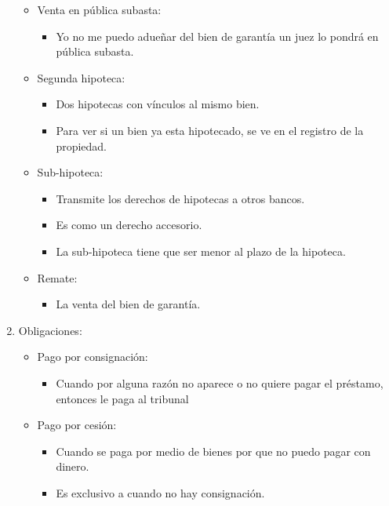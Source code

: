 \begin{enumerate}
\begin{itemize}
            \item Venta en pública subasta: 
                \begin{itemize}
                    \item Yo no me puedo adueñar del bien de garantía un juez lo pondrá en pública subasta.
                \end{itemize}
            
            \item Segunda hipoteca: 
                \begin{itemize}
                    \item Dos hipotecas con vínculos al mismo bien.
                    \item Para ver si un bien ya esta hipotecado, se ve en el registro de la propiedad.
                \end{itemize}
            
            \item Sub-hipoteca: 
                \begin{itemize}
                    \item Transmite los derechos de hipotecas a otros bancos.
                    \item Es como un derecho accesorio.
                    \item La sub-hipoteca tiene que ser menor al plazo de la hipoteca. 
                \end{itemize}
            
            \item Remate: 
                \begin{itemize}
                    \item La venta del bien de garantía.
                \end{itemize}

        \end{itemize}

    
    \item Obligaciones:
        \begin{itemize}
            \item Pago por consignación: 
                \begin{itemize}
                    \item Cuando por alguna razón no aparece o no quiere pagar el préstamo, entonces le paga al tribunal
                \end{itemize}
            
            \item Pago por cesión:
                \begin{itemize}
                    \item Cuando se paga por medio de bienes por que no puedo pagar con dinero.
                    \item Es exclusivo a cuando no hay consignación.
                \end{itemize}
            

\end{itemize}
\end{enumerate}
